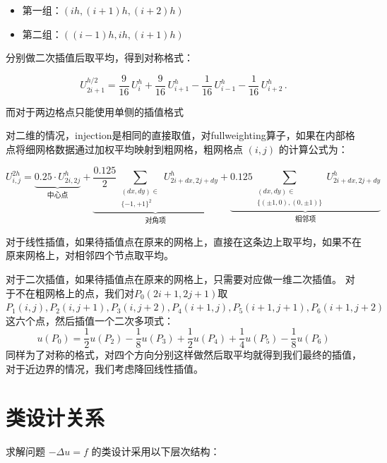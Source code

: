 \documentclass[a4paper]{ctexart} %
\begin{document}
\begin{itemize}
    \item 第一组：$(ih, (i+1)h, (i+2)h)$
    \item 第二组：$((i-1)h, ih, (i+1)h)$
\end{itemize}

分别做二次插值后取平均，得到对称格式：

\[
U_{2i+1}^{h/2} = \frac{9}{16}\,U_i^h + \frac{9}{16}\,U_{i+1}^h - \frac{1}{16}\,U_{i-1}^h - \frac{1}{16}\,U_{i+2}^h\,.
\]

而对于两边格点只能使用单侧的插值格式

对二维的情况，injection是相同的直接取值，对fullweighting算子，如果在内部格点将细网格数据通过加权平均映射到粗网格，粗网格点 $(i,j)$ 的计算公式为：

\[
U_{i,j}^{2h} = \underbrace{0.25 \cdot U_{2i,2j}^{h}}_{\text{中心点}} 
+ \underbrace{\frac{0.125}{2} \sum_{\substack{(dx, dy) \in \\ \{-1,+1\}^2}} U_{2i+dx,2j+dy}^{h}}_{\text{对角项}} 
+ \underbrace{0.125 \sum_{\substack{(dx, dy) \in \\ \{(\pm1,0), (0,\pm1)\}}} U_{2i+dx,2j+dy}^{h}}_{\text{相邻项}}
\]

对于线性插值，如果待插值点在原来的网格上，直接在这条边上取平均，如果不在原来网格上，对相邻四个节点取平均。

对于二次插值，如果待插值点在原来的网格上，只需要对应做一维二次插值。
对于不在粗网格上的点，我们对$P_0(2i+1,2j+1)$取
$P_1(i,j),P_2(i,j+1),P_3(i,j+2),P_4(i+1,j),P_5(i+1,j+1),P_6(i+1,j+2)$这六个点，然后插值一个二次多项式：
\[
u(P_0) = \frac{1}{2} u(P_2) - \frac{1}{8} u(P_3) + \frac{1}{2} u(P_4) + \frac{1}{4} u(P_5) - \frac{1}{8} u(P_6)
\]
同样为了对称的格式，对四个方向分别这样做然后取平均就得到我们最终的插值，对于近边界的情况，我们考虑降回线性插值。

\section{类设计关系}

求解问题 $-\Delta u = f$ 的类设计采用以下层次结构：
\end{document}
